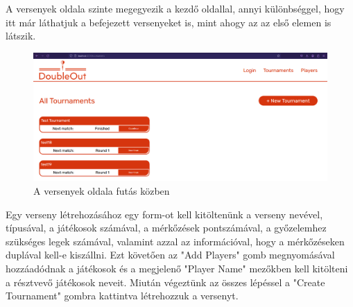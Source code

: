 A versenyek oldala szinte megegyezik a kezdő oldallal, annyi különbséggel, hogy itt már láthatjuk a befejezett versenyeket is, mint ahogy az az első elemen is látszik.

\begin{figure}[h]
\centering
\includegraphics[scale=0.3]{images/TournamentsTest.png}
\caption{A versenyek oldala futás közben}
\label{fig:tournamentsTest}
\end{figure}

Egy verseny létrehozásához egy form-ot kell kitöltenünk a verseny nevével, típusával, a játékosok számával, a mérkőzések pontszámával, a győzelemhez szükséges legek számával, valamint azzal az információval, hogy a mérkőzéseken duplával kell-e kiszállni. Ezt követően az "Add Players" gomb megnyomásával hozzáadódnak a játékosok és a megjelenő "Player Name" mezőkben kell kitölteni a résztvevő játékosok neveit. Miután végeztünk az összes lépéssel a "Create Tournament" gombra kattintva létrehozzuk a versenyt.

